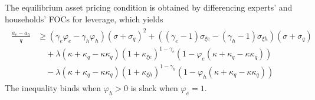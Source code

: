 \documentclass[12 pt, oneside]{article}
\theoremstyle{definition}
\theoremstyle{definition}
\theoremstyle{definition}
\begin{document}
The equilibrium asset pricing condition is obtained by differencing experts' and households' FOCs for leverage, which yields
\begin{align}\label{eq:asset pricing cond}
\begin{split}
  \frac{a_e - a_h}{q} & \geq (\gamma_e\varphi_e - \gamma_h\varphi_h)(\sigma + \sigma_q)^2 + ((\gamma_e - 1) \sigma_{\xi e} - (\gamma_h - 1)\sigma_{\xi h})(\sigma + \sigma_q)\\
  &\quad + \lambda(\kappa + \kappa_q - \kappa\kappa_q)(1 + \kappa_{\xi e})^{ 1- \gamma_e}(1 - \varphi_e(\kappa + \kappa_q - \kappa\kappa_q))\\
  &\quad - \lambda(\kappa + \kappa_q - \kappa\kappa_q)(1 + \kappa_{\xi h})^{ 1- \gamma_h}(1 - \varphi_h(\kappa + \kappa_q - \kappa\kappa_q))
\end{split}
\end{align}
The inequality binds when $\varphi_h > 0$ is slack when $\varphi_e = 1$.
\end{document}
